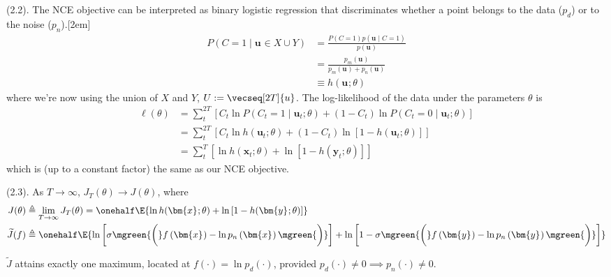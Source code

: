 \documentclass[11pt]{article}
\renewcommand\vec[2][]{\bm{#2}_{#1}}
\newcommand\myspace[1][]{\vspace{#1\bigskipamount}}
\newcommand\p{\Needspace{10\baselineskip} \noindent}
\begin{document}
\myspace
\p {} (2.2). The NCE objective can be interpreted as binary logistic regression that discriminates whether a point belongs to the data ($p_d$) or to the noise ($p_n$).[2em]
\begin{align}
	P(C{=}1 \mid \vec u \in X \cup Y)
		&= \frac{ P(C{=1}) p(\vec u \mid C{=}1) }{  p(\vec u) } \\
		&= \frac{  p_m(\vec u) }{   p_m(\vec u) + p_n(\vec u)  } \\
		&\equiv h(\vec u; \theta)
\end{align}
where we're now using the union of $X$ and $Y$, $U := \vecseq[2T]{u}$. The log-likelihood of the data under the parameters $\theta$ is
\begin{align}
	\ell(\theta)
		&= \sum_t^{2T} \left[
			C_t \ln P(C_t{=}1 \mid \vec[t]{u};\theta) 
			+ (1 - C_t) \ln P(C_t{=}0 \mid \vec[t]{u} ; \theta) \right] \\
		&= \sum_t^{2T} \left[
			C_t \ln h(\vec[t]{u}; \theta)
			+ (1 - C_t) \ln \left[ 1 - h(\vec[t]{u}; \theta)  \right] \right] \\
		&= \sum_t^T \left[
				\ln h(\vec[t]{x}; \theta)
			+ \ln \left[ 1 - h(\vec[t]{y}; \theta)  \right]
		\right]
\end{align}
which is (up to a constant factor) the same as our NCE objective.


\myspace
\p {} (2.3). As $T \rightarrow \infty$, $J_T(\theta) \rightarrow J(\theta)$, where
\begin{align}
	J(\theta) 
		&\triangleq \lim_{T \rightarrow \infty} J_T(\theta)
		= \onehalf \E{\ln h(\vec x; \theta)     +    \ln\left[1 -  h(\vec y; \theta) \right]  } \\
	\widetilde{J}(f)
		&\triangleq \onehalf \E{ 
			   \ln\left[   \sigma \mgreen{ \bigg( }  f\left(\vec x\right) - \ln p_n\left( \vec x \right)  \mgreen{ \bigg) }   \right] 
			+ \ln\left[  1 -  \sigma \mgreen{ \bigg( }  f\left(\vec y\right) - \ln p_n\left( \vec y \right)   \mgreen{ \bigg) }  \right]    }
\end{align}
\begin{definition}[-1em][Theorem 1]
	$\widetilde J$ attains exactly one maximum, located at $f(\cdot) = \ln p_d(\cdot)$, provided $p_d(\cdot){\ne}0 \implies p_n(\cdot){\ne}0$. 
\end{definition}
\end{document}
